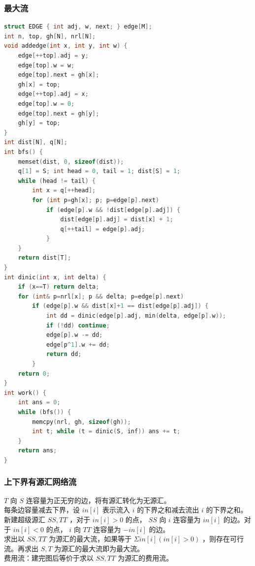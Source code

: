\documentclass{article}
\begin{document}
\begin{CJK}{UTF8}{song}
\subsubsection{最大流}
\begin{lstlisting}[language=C++]
struct EDGE { int adj, w, next; } edge[M];
int n, top, gh[N], nrl[N];
void addedge(int x, int y, int w) {
	edge[++top].adj = y;
	edge[top].w = w;
	edge[top].next = gh[x];
	gh[x] = top;
	edge[++top].adj = x;
	edge[top].w = 0;
	edge[top].next = gh[y];
	gh[y] = top;
}
int dist[N], q[N];
int bfs() {
	memset(dist, 0, sizeof(dist));
	q[1] = S; int head = 0, tail = 1; dist[S] = 1;
	while (head != tail) {
		int x = q[++head];
		for (int p=gh[x]; p; p=edge[p].next)
			if (edge[p].w && !dist[edge[p].adj]) {
				dist[edge[p].adj] = dist[x] + 1;
				q[++tail] = edge[p].adj;
			}
	}
	return dist[T];
}
int dinic(int x, int delta) {
	if (x==T) return delta;
	for (int& p=nrl[x]; p && delta; p=edge[p].next)
		if (edge[p].w && dist[x]+1 == dist[edge[p].adj]) {
			int dd = dinic(edge[p].adj, min(delta, edge[p].w));
			if (!dd) continue;
			edge[p].w -= dd;
			edge[p^1].w += dd;
			return dd;
		}
	return 0;
}
int work() {
	int ans = 0;
	while (bfs()) {
		memcpy(nrl, gh, sizeof(gh));
		int t; while (t = dinic(S, inf)) ans += t;
	}
	return ans;
}
\end{lstlisting}
\subsubsection{上下界有源汇网络流}
$T$ 向 $S$ 连容量为正无穷的边，将有源汇转化为无源汇。 \\
每条边容量减去下界，设 $in[i]$ 表示流入 $i$ 的下界之和减去流出 $i$ 的下界之和。  \\
新建超级源汇 $SS, TT$ ，对于 $in[i] > 0$ 的点， $SS$ 向 $i$ 连容量为 $in[i]$ 的边。对于 $in[i] < 0$ 的点， $i$ 向 $TT$ 连容量为 $-in[i]$ 的边。 \\
求出以 $SS, TT$ 为源汇的最大流，如果等于 $\Sigma in[i] (in[i]>0)$ ，则存在可行流。再求出 $S, T$ 为源汇的最大流即为最大流。 \\
费用流：建完图后等价于求以 $SS, TT$ 为源汇的费用流。

\end{CJK}
\end{document}
